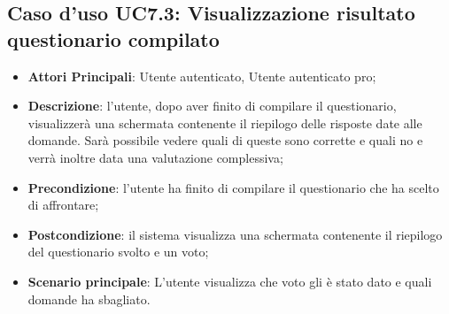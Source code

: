 \subsection{Caso d'uso UC7.3: Visualizzazione risultato questionario compilato}
\begin{itemize}
\item\textbf{Attori Principali}: Utente autenticato, Utente autenticato pro;
\item\textbf{Descrizione}: l'utente, dopo aver finito di compilare il questionario, visualizzerà una schermata contenente il riepilogo delle risposte date alle domande. Sarà possibile vedere quali di queste sono corrette e quali no e verrà inoltre data una valutazione complessiva;
\item\textbf{Precondizione}: l'utente ha finito di compilare il questionario che ha scelto di affrontare;
\item\textbf{Postcondizione}: il sistema visualizza una schermata contenente il riepilogo del questionario svolto e un voto;
\item\textbf{Scenario principale}: L'utente visualizza che voto gli è stato dato e quali domande ha sbagliato.
\end{itemize}

